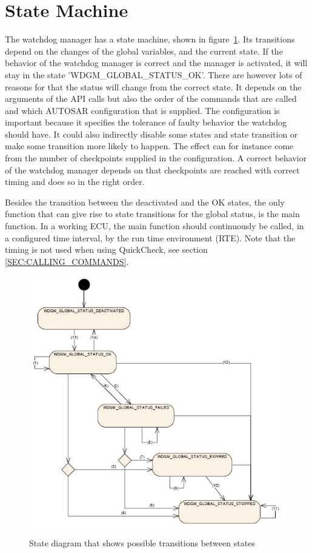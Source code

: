 \section{State Machine}
The watchdog manager has a state machine, shown in
figure~\ref{FIG:GLOBALSTATUSES}. Its transitions depend on the changes of the
global variables, and the current state. If the behavior of the watchdog manager
is correct and the manager is activated, it will stay in the state
'WDGM\_GLOBAL\_STATUS\_OK'. There are however lots of reasons for that the
status will change from the correct state. It depends on the arguments of the
API calls but also the order of the commands that are called and which AUTOSAR
configuration that is supplied. The configuration is important because it
specifies the tolerance of faulty behavior the watchdog should have. It could
also indirectly disable some states and state transition or make some
transition more likely to happen. The effect can for instance come from the
number of checkpoints supplied in the configuration. A correct behavior of the
watchdog manager depends on that checkpoints are reached with correct timing
and does so in the right order.

Besides the transition between the deactivated and the OK states, the only
function that can give rise to state transitions for the global status, is the
main function. In a working ECU, the main function should continuously be
called, in a configured time interval, by the run time environment (RTE). Note
that the timing is not used when using QuickCheck, see section
\ref{SEC:CALLING_COMMANDS}.

\begin{figure}[h!]
  \begin{center}
    \includegraphics{pictures/globalstatuses.jpg}
  \end{center}
  \caption{State diagram that shows possible transitions between states}
  \label{FIG:GLOBALSTATUSES}
\end{figure}

